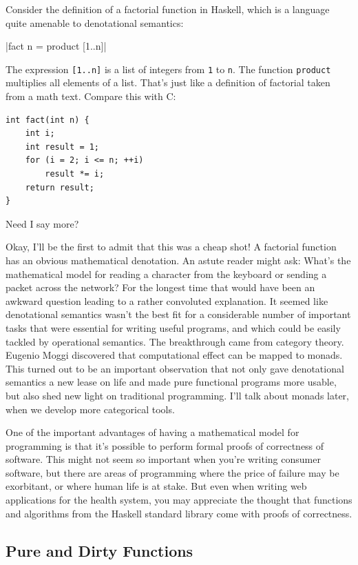 Consider the definition of a factorial function in Haskell, which is a
language quite amenable to denotational semantics:

|fact n = product [1..n]|

The expression \texttt{{[}1..n{]}} is a list of integers from \texttt{1} to \texttt{n}.
The function \texttt{product} multiplies all elements of a list. That's
just like a definition of factorial taken from a math text. Compare this
with C:

\begin{verbatim}
int fact(int n) {
    int i;
    int result = 1;
    for (i = 2; i <= n; ++i)
        result *= i;
    return result;
}
\end{verbatim}

Need I say more?

Okay, I'll be the first to admit that this was a cheap shot! A factorial
function has an obvious mathematical denotation. An astute reader might
ask: What's the mathematical model for reading a character from the
keyboard or sending a packet across the network? For the longest time
that would have been an awkward question leading to a rather convoluted
explanation. It seemed like denotational semantics wasn't the best fit
for a considerable number of important tasks that were essential for
writing useful programs, and which could be easily tackled by
operational semantics. The breakthrough came from category theory.
Eugenio Moggi discovered that computational effect can be mapped to
monads. This turned out to be an important observation that not only
gave denotational semantics a new lease on life and made pure functional
programs more usable, but also shed new light on traditional
programming. I'll talk about monads later, when we develop more
categorical tools.

One of the important advantages of having a mathematical model for
programming is that it's possible to perform formal proofs of
correctness of software. This might not seem so important when you're
writing consumer software, but there are areas of programming where the
price of failure may be exorbitant, or where human life is at stake. But
even when writing web applications for the health system, you may
appreciate the thought that functions and algorithms from the Haskell
standard library come with proofs of correctness.

\subsection{Pure and Dirty Functions}\label{pure-and-dirty-functions}

